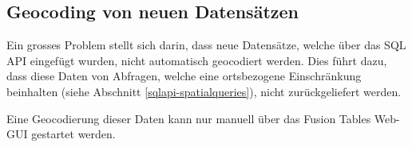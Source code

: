 \subsection{Geocoding von neuen Datensätzen}
\label{geocodierung-bug}
Ein grosses Problem stellt sich darin, dass neue Datensätze, welche über das SQL \gls{API} eingefügt wurden, nicht automatisch geocodiert werden. Dies führt dazu, dass diese Daten von Abfragen, welche eine ortsbezogene Einschränkung beinhalten (siehe Abschnitt \ref{sqlapi-spatialqueries}), nicht zurückgeliefert werden.

Eine \gls{Geocodierung} dieser Daten kann nur manuell über das Fusion Tables Web-GUI gestartet werden.